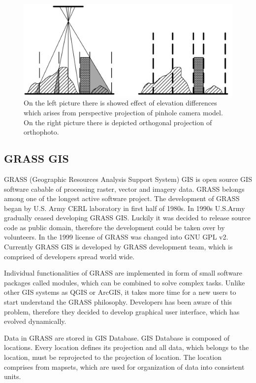 \documentclass[a4paper,12pt]{article}
\begin{document}
\begin{figure}[h]
    \centering
    \includegraphics[scale=0.2]{figures/orthophoto.png}
    \caption{On the left picture there is showed effect of elevation differences 
    which arises from perspective projection of pinhole camera model. 
    On the right picture there is depicted orthogonal projection of orthophoto.}
    \label{fig:ortho}
\end{figure}


\subsection{GRASS GIS}

GRASS (Geographic Resources Analysis Support System) GIS is open source GIS software cabable of processing raster, vector and imagery data. 
GRASS belongs among one of 
the longest active software project. The development of GRASS began by U.S. Army CERL  laboratory
in first half of 1980s. In 1990s U.S.Army gradually ceased developing GRASS GIS. Luckily it was decided to 
release source code as public domain, therefore the development could be taken over by volunteers. In the 1999 license 
of GRASS was changed into GNU GPL v2. Currently GRASS GIS is developed by GRASS development 
team, which is comprised of developers spread world wide. 
 
Individual functionalities of GRASS are implemented in form of small software packages called modules, which 
can be combined to solve complex tasks.
Unlike other GIS systems as QGIS or ArcGIS, it takes 
more time for a new users to start understand the GRASS philosophy. Developers 
has been aware of this problem, therefore they decided to develop graphical user interface, which 
has evolved dynamically.

Data in GRASS are stored in GIS Database. GIS Database is composed of locations. Every location 
defines its projection and all data, which belongs to the location, must be reprojected to 
the projection of location. The location comprises from mapsets, which are used for organization 
of data into consistent units. 
\end{document}
